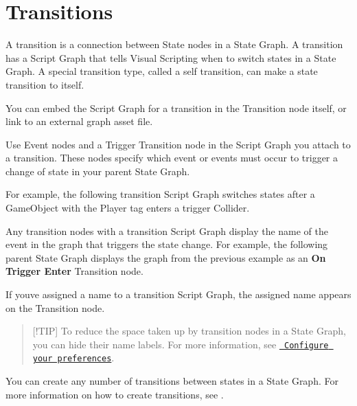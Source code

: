 \chapter{Transitions}
\hypertarget{md__library_2_package_cache_2com_8unity_8visualscripting_0d1_89_82_2_documentation_0i_2vs-transitions}{}\label{md__library_2_package_cache_2com_8unity_8visualscripting_0d1_89_82_2_documentation_0i_2vs-transitions}
\label{md__library_2_package_cache_2com_8unity_8visualscripting_0d1_89_82_2_documentation_0i_2vs-transitions_autotoc_md2125}%
%
 A transition is a connection between State nodes in a State Graph. A transition has a Script Graph that tells Visual Scripting when to switch states in a State Graph. A special transition type, called a self transition, can make a state transition to itself.

You can embed the Script Graph for a transition in the Transition node itself, or link to an external graph asset file.

Use Event nodes and a Trigger Transition node in the Script Graph you attach to a transition. These nodes specify which event or events must occur to trigger a change of state in your parent State Graph.

For example, the following transition Script Graph switches states after a Game\+Object with the Player tag enters a trigger Collider.



Any transition nodes with a transition Script Graph display the name of the event in the graph that triggers the state change. For example, the following parent State Graph displays the graph from the previous example as an {\bfseries{On Trigger Enter}} Transition node.



If you\textquotesingle{}ve assigned a name to a transition Script Graph, the assigned name appears on the Transition node.

\begin{quote}
\mbox{[}!\+TIP\mbox{]} To reduce the space taken up by transition nodes in a State Graph, you can hide their name labels. For more information, see \href{vs-set-preferences.md\#state-graphs-preferences}{\texttt{ Configure your preferences}}. \end{quote}
You can create any number of transitions between states in a State Graph. For more information on how to create transitions, see . 